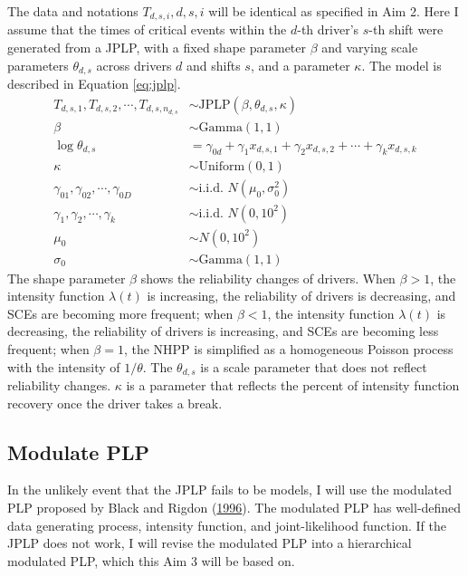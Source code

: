 \documentclass[12pt]{book}
\numberwithin{equation}{chapter}
\begin{document}
The data and notations \(T_{d, s, i}, d, s, i\) will be identical as specified in Aim 2. Here I assume that the times of critical events within the \(d\)-th driver's \(s\)-th shift were generated from a JPLP, with a fixed shape parameter \(\beta\) and varying scale parameters \(\theta_{d, s}\) across drivers \(d\) and shifts \(s\), and a parameter \(\kappa\). The model is described in Equation \eqref{eq:jplp}.
\begin{equation}
\begin{aligned}
  T_{d, s, 1}, T_{d, s, 2}, \cdots , T_{d, s, n_{d, s}} & \sim \text{JPLP}(\beta, \theta_{d, s}, \kappa)\\
  \beta & \sim \text{Gamma}(1, 1)\\
  \log\theta_{d, s} &= \gamma_{0d} + \gamma_{1}x_{d, s, 1} + \gamma_{2}x_{d, s, 2} + \cdots + \gamma_{k}x_{d, s, k}\\
  \kappa & \sim \text{Uniform}(0, 1)\\
  \gamma_{01}, \gamma_{02}, \cdots, \gamma_{0D} & \sim \text{i.i.d. }N(\mu_0, \sigma_0^2)\\
  \gamma_1, \gamma_2, \cdots, \gamma_k & \sim \text{i.i.d. }N(0, 10^2)\\
  \mu_0 &\sim N(0, 10^2) \\
  \sigma_0 &\sim \text{Gamma}(1, 1)
\label{eq:jplp}
\end{aligned}
\end{equation}
The shape parameter \(\beta\) shows the reliability changes of drivers. When \(\beta > 1\), the intensity function \(\lambda(t)\) is increasing, the reliability of drivers is decreasing, and SCEs are becoming more frequent; when \(\beta < 1\), the intensity function \(\lambda(t)\) is decreasing, the reliability of drivers is increasing, and SCEs are becoming less frequent; when \(\beta = 1\), the NHPP is simplified as a homogeneous Poisson process with the intensity of \(1/\theta\). The \(\theta_{d, s}\) is a scale parameter that does not reflect reliability changes. \(\kappa\) is a parameter that reflects the percent of intensity function recovery once the driver takes a break.

\hypertarget{modulate-plp}{%
\subsection{Modulate PLP}\label{modulate-plp}}

In the unlikely event that the JPLP fails to be models, I will use the modulated PLP proposed by Black and Rigdon (\protect\hyperlink{ref-black1996statistical}{1996}). The modulated PLP has well-defined data generating process, intensity function, and joint-likelihood function. If the JPLP does not work, I will revise the modulated PLP into a hierarchical modulated PLP, which this Aim 3 will be based on.
\end{document}
